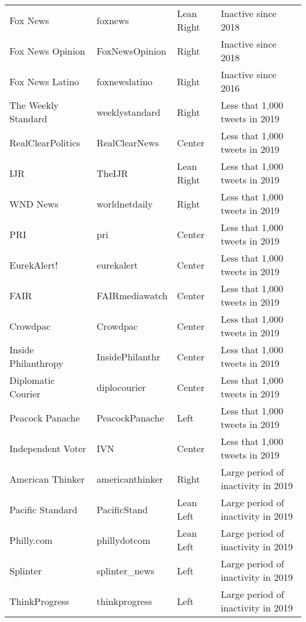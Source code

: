 \begin{tabular}{llll}
                    Fox News &          foxnews &    Lean Right &                       Inactive since 2018 \\
            Fox News Opinion &   FoxNewsOpinion &         Right &                       Inactive since 2018 \\
             Fox News Latino &    foxnewslatino &         Right &                       Inactive since 2016 \\
         The Weekly Standard &   weeklystandard &         Right &            Less that 1,000 tweets in 2019 \\
           RealClearPolitics &    RealClearNews &        Center &            Less that 1,000 tweets in 2019 \\
                         IJR &           TheIJR &    Lean Right &            Less that 1,000 tweets in 2019 \\
                    WND News &    worldnetdaily &         Right &            Less that 1,000 tweets in 2019 \\
                         PRI &              pri &        Center &            Less that 1,000 tweets in 2019 \\
                 EurekAlert! &       eurekalert &        Center &            Less that 1,000 tweets in 2019 \\
                        FAIR &   FAIRmediawatch &        Center &            Less that 1,000 tweets in 2019 \\
                    Crowdpac &         Crowdpac &        Center &            Less that 1,000 tweets in 2019 \\
         Inside Philanthropy &  InsidePhilanthr &        Center &            Less that 1,000 tweets in 2019 \\
          Diplomatic Courier &     diplocourier &        Center &            Less that 1,000 tweets in 2019 \\
             Peacock Panache &   PeacockPanache &          Left &            Less that 1,000 tweets in 2019 \\
           Independent Voter &              IVN &        Center &            Less that 1,000 tweets in 2019 \\
            American Thinker &  americanthinker &         Right &        Large period of inactivity in 2019 \\
            Pacific Standard &     PacificStand &     Lean Left &        Large period of inactivity in 2019 \\
                  Philly.com &     phillydotcom &     Lean Left &        Large period of inactivity in 2019 \\
                    Splinter &    splinter\_news &          Left &        Large period of inactivity in 2019 \\
               ThinkProgress &    thinkprogress &          Left &        Large period of inactivity in 2019 \\
\bottomrule
\end{tabular}
